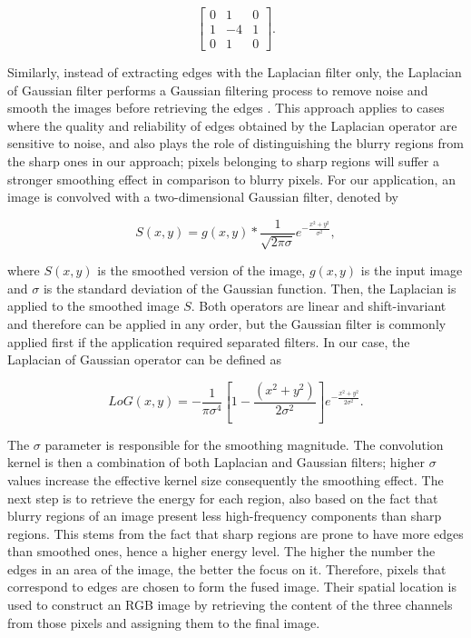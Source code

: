 \begin{equation*}
\label{eqn:discrete_laplacian}
\begin{bmatrix}
0 & 1 & 0 \\
1 & -4 & 1 \\
0 & 1 & 0
\end{bmatrix}.
\end{equation*}

Similarly, instead of extracting edges with the Laplacian filter only, the Laplacian of Gaussian filter performs a Gaussian filtering process to remove noise and smooth the images before retrieving the edges \cite{marr1980theory}. This approach applies to cases where the quality and reliability of edges obtained by the Laplacian operator are sensitive to noise, and also plays the role of distinguishing the blurry regions from the sharp ones in our approach; pixels belonging to sharp regions will suffer a stronger smoothing effect in comparison to blurry pixels. For our application, an image is convolved with a two-dimensional Gaussian filter, denoted by

\begin{equation}
\label{eqn:gaussian_filter}
S(x,y) = g(x,y) \ast \frac{1}{\sqrt{2 \pi \sigma}} e^{- \frac{x^{2} + y^{2}}{\sigma^{2}}},
\end{equation}

\noindent where $S(x,y)$ is the smoothed version of the image, $g(x,y)$ is the input image and $\sigma$ is the standard deviation of the Gaussian function. Then, the Laplacian is applied to the smoothed image $S$. Both operators are linear and shift-invariant and therefore can be applied in any order, but the Gaussian filter is commonly applied first if the application required separated filters. In our case, the Laplacian of Gaussian operator can be defined as

\begin{equation}
\label{eqn:laplacian_of_gaussian}
LoG(x,y) = - \frac{1}{\pi \sigma^{4}}
            \left[
                1 - \frac{(x^{2} + y^{2})}{2 \sigma^{2}}
            \right]
            e^{- \frac{x^{2} + y^{2}}{2 \sigma^{2}}}.
\end{equation}

\noindent The $\sigma$ parameter is responsible for the smoothing magnitude. The convolution kernel is then a combination of both Laplacian and Gaussian filters; higher $\sigma$ values increase the effective kernel size consequently the smoothing effect. The next step is to retrieve the energy for each region, also based on the fact that blurry regions of an image present less high-frequency components than sharp regions. This stems from the fact that sharp regions are prone to have more edges than smoothed ones, hence a higher energy level. The higher the number the edges in an area of the image, the better the focus on it. Therefore, pixels that correspond to edges are chosen to form the fused image. Their spatial location is used to construct an RGB image by retrieving the content of the three channels from those pixels and assigning them to the final image.